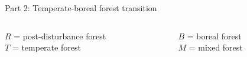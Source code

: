 \documentclass[10pt,aspectratio=149]{beamer}
\begin{document}
\begin{frame}[fragile]{Part 2: Temperate-boreal forest transition}

\begin{columns}
\begin{column}{0.5\textwidth}

$R$ = post-disturbance forest\\
$T$ = temperate forest\\

\end{column}
\begin{column}{0.5\textwidth}

$B$ = boreal forest\\
$M$ = mixed forest\\
\end{column}
\end{columns}









\end{frame}
\end{document}
